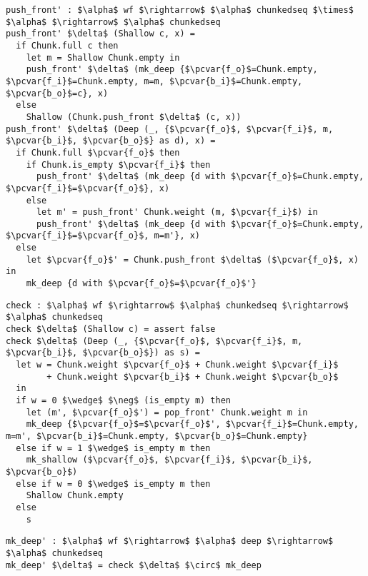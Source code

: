 \documentclass[10pt]{article}
\newcommand{\pcvar}[1]{\mathtt{#1}}
\begin{document}
\begin{lstlisting}[language=pcpp,style=nonumbers]
push_front' : $\alpha$ wf $\rightarrow$ $\alpha$ chunkedseq $\times$ $\alpha$ $\rightarrow$ $\alpha$ chunkedseq
push_front' $\delta$ (Shallow c, x) =
  if Chunk.full c then
    let m = Shallow Chunk.empty in
    push_front' $\delta$ (mk_deep {$\pcvar{f_o}$=Chunk.empty, $\pcvar{f_i}$=Chunk.empty, m=m, $\pcvar{b_i}$=Chunk.empty, $\pcvar{b_o}$=c}, x)
  else
    Shallow (Chunk.push_front $\delta$ (c, x))
push_front' $\delta$ (Deep (_, {$\pcvar{f_o}$, $\pcvar{f_i}$, m, $\pcvar{b_i}$, $\pcvar{b_o}$} as d), x) =
  if Chunk.full $\pcvar{f_o}$ then
    if Chunk.is_empty $\pcvar{f_i}$ then
      push_front' $\delta$ (mk_deep {d with $\pcvar{f_o}$=Chunk.empty, $\pcvar{f_i}$=$\pcvar{f_o}$}, x)
    else
      let m' = push_front' Chunk.weight (m, $\pcvar{f_i}$) in
      push_front' $\delta$ (mk_deep {d with $\pcvar{f_o}$=Chunk.empty, $\pcvar{f_i}$=$\pcvar{f_o}$, m=m'}, x)
  else
    let $\pcvar{f_o}$' = Chunk.push_front $\delta$ ($\pcvar{f_o}$, x) in
    mk_deep {d with $\pcvar{f_o}$=$\pcvar{f_o}$'}
\end{lstlisting}

\begin{lstlisting}[language=pcpp,style=nonumbers]
check : $\alpha$ wf $\rightarrow$ $\alpha$ chunkedseq $\rightarrow$ $\alpha$ chunkedseq
check $\delta$ (Shallow c) = assert false
check $\delta$ (Deep (_, {$\pcvar{f_o}$, $\pcvar{f_i}$, m, $\pcvar{b_i}$, $\pcvar{b_o}$}) as s) =
  let w = Chunk.weight $\pcvar{f_o}$ + Chunk.weight $\pcvar{f_i}$
        + Chunk.weight $\pcvar{b_i}$ + Chunk.weight $\pcvar{b_o}$
  in
  if w = 0 $\wedge$ $\neg$ (is_empty m) then
    let (m', $\pcvar{f_o}$') = pop_front' Chunk.weight m in
    mk_deep {$\pcvar{f_o}$=$\pcvar{f_o}$', $\pcvar{f_i}$=Chunk.empty, m=m', $\pcvar{b_i}$=Chunk.empty, $\pcvar{b_o}$=Chunk.empty}
  else if w = 1 $\wedge$ is_empty m then
    mk_shallow ($\pcvar{f_o}$, $\pcvar{f_i}$, $\pcvar{b_i}$, $\pcvar{b_o}$)
  else if w = 0 $\wedge$ is_empty m then
    Shallow Chunk.empty
  else
    s
\end{lstlisting}

\begin{lstlisting}[language=pcpp,style=nonumbers]
mk_deep' : $\alpha$ wf $\rightarrow$ $\alpha$ deep $\rightarrow$ $\alpha$ chunkedseq
mk_deep' $\delta$ = check $\delta$ $\circ$ mk_deep
\end{lstlisting}
\end{document}
